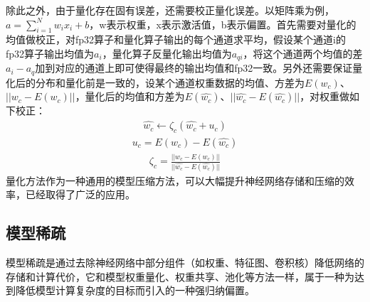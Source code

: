 \documentclass[letterpaper,10pt,english]{sphinxmanual}
\begin{document}
\sphinxAtStartPar
除此之外，由于量化存在固有误差，还需要校正量化误差。以矩阵乘为例，\(a=\sum_{i=1}^Nw_ix_i+b\)，w表示权重，x表示激活值，b表示偏置。首先需要对量化的均值做校正，对fp32算子和量化算子输出的每个通道求平均，假设某个通道i的fp32算子输出均值为\(a_i\)，量化算子反量化输出均值为\(a_{qi}\)，将这个通道两个均值的差\(a_i-a_q\)加到对应的通道上即可使得最终的输出均值和fp32一致。另外还需要保证量化后的分布和量化前是一致的，设某个通道权重数据的均值、方差为\(E(w_c)\)、\(||w_c-E(w_c)||\)，量化后的均值和方差为\(E(\hat{w_c})\)、\(||\hat{w_c}-E(\hat{w_c})||\)，对权重做如下校正：
\begin{equation}\label{equation:chapter_model_deployment/model_compression:chapter_model_deployment/model_compression:1}
\begin{split}\hat{w_c}\leftarrow\zeta_c(\hat{w_c}+u_c)\end{split}
\end{equation}\begin{equation}\label{equation:chapter_model_deployment/model_compression:chapter_model_deployment/model_compression:2}
\begin{split}u_c=E(w_c)-E(\hat{w_c})\end{split}
\end{equation}\begin{equation}\label{equation:chapter_model_deployment/model_compression:chapter_model_deployment/model_compression:3}
\begin{split}\zeta_c=\frac{||w_c-E(w_c)||}{||\hat{w_c}-E(\hat{w_c})||}\end{split}
\end{equation}
\sphinxAtStartPar
量化方法作为一种通用的模型压缩方法，可以大幅提升神经网络存储和压缩的效率，已经取得了广泛的应用。


\subsection{模型稀疏}
\label{\detokenize{chapter_model_deployment/model_compression:id5}}
\sphinxAtStartPar
模型稀疏是通过去除神经网络中部分组件（如权重、特征图、卷积核）降低网络的存储和计算代价，它和模型权重量化、权重共享、池化等方法一样，属于一种为达到降低模型计算复杂度的目标而引入的一种强归纳偏置。
\end{document}
